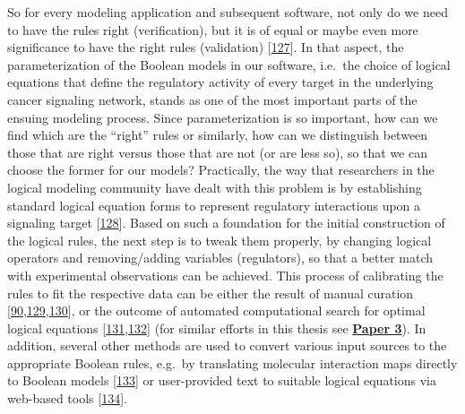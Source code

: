 \documentclass[
  12pt,
]{book}
\begin{document}
So for every modeling application and subsequent software, not only do we need to have the rules right (verification), but it is of equal or maybe even more significance to have the right rules (validation) {[}\protect\hyperlink{ref-Roache1997}{127}{]}.
In that aspect, the parameterization of the Boolean models in our software, i.e.~the choice of logical equations that define the regulatory activity of every target in the underlying cancer signaling network, stands as one of the most important parts of the ensuing modeling process.
Since parameterization is so important, how can we find which are the ``right'' rules or similarly, how can we distinguish between those that are right versus those that are not (or are less so), so that we can choose the former for our models?
Practically, the way that researchers in the logical modeling community have dealt with this problem is by establishing standard logical equation forms to represent regulatory interactions upon a signaling target {[}\protect\hyperlink{ref-Mendoza2006}{128}{]}.
Based on such a foundation for the initial construction of the logical rules, the next step is to tweak them properly, by changing logical operators and removing/adding variables (regulators), so that a better match with experimental observations can be achieved.
This process of calibrating the rules to fit the respective data can be either the result of manual curation {[}\protect\hyperlink{ref-Flobak2015}{90},\protect\hyperlink{ref-Faure2009}{129},\protect\hyperlink{ref-Niederdorfer2020}{130}{]}, or the outcome of automated computational search for optimal logical equations {[}\protect\hyperlink{ref-Videla2016}{131},\protect\hyperlink{ref-Gjerga2020}{132}{]} (for similar efforts in this thesis see \textbf{\protect\hyperlink{Paper3}{Paper 3}}).
In addition, several other methods are used to convert various input sources to the appropriate Boolean rules, e.g.~by translating molecular interaction maps directly to Boolean models {[}\protect\hyperlink{ref-Aghamiri2020}{133}{]} or user-provided text to suitable logical equations via web-based tools {[}\protect\hyperlink{ref-Helikar2012}{134}{]}.

\vspace{-6pt}
\end{document}

